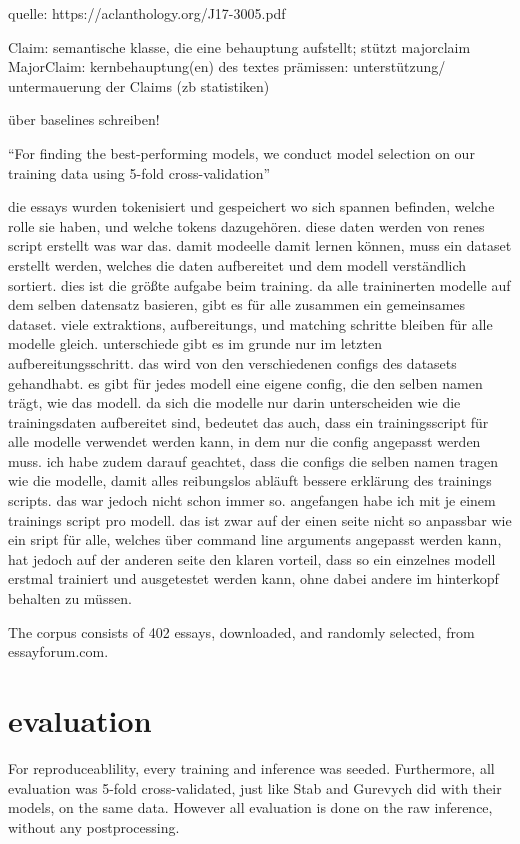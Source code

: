 \documentclass[12]{article}
\theoremstyle{mytheoremstyle}
\theoremstyle{mytheoremstyle}
\theoremstyle{myproblemstyle}
\begin{document}
  quelle: https://aclanthology.org/J17-3005.pdf

  Claim: semantische klasse, die eine behauptung aufstellt; stützt majorclaim 
  MajorClaim: kernbehauptung(en) des textes 
  prämissen: unterstützung/ untermauerung der Claims (zb statistiken) 

  über baselines schreiben!

  ``For finding the best-performing models, we conduct model selection on our training data using 5-fold cross-validation''


  die essays wurden tokenisiert und gespeichert wo sich spannen befinden, welche rolle sie haben, und welche tokens dazugehören. diese daten werden von renes script erstellt was war das. damit modeelle damit lernen können, muss ein dataset erstellt werden, welches die daten aufbereitet und dem modell verständlich sortiert. dies ist die größte aufgabe beim training. da alle traininerten modelle auf dem selben datensatz basieren, gibt es für alle zusammen ein gemeinsames dataset. viele extraktions, aufbereitungs, und matching schritte bleiben für alle modelle gleich. unterschiede gibt es im grunde nur im letzten aufbereitungsschritt. das wird von den verschiedenen configs des datasets gehandhabt. es gibt für jedes modell eine eigene config, die den selben namen trägt, wie das modell. da sich die modelle nur darin unterscheiden wie die trainingsdaten aufbereitet sind, bedeutet das auch, dass ein trainingsscript für alle modelle verwendet werden kann, in dem nur die config angepasst werden muss. ich habe zudem darauf geachtet, dass die configs die selben namen tragen wie die modelle, damit alles reibungslos abläuft bessere erklärung des trainings scripts. das war jedoch nicht schon immer so. angefangen habe ich mit je einem trainings script pro modell. das ist zwar auf der einen seite nicht so anpassbar wie ein sript für alle, welches über command line arguments angepasst werden kann, hat jedoch auf der anderen seite den klaren vorteil, dass so ein einzelnes modell erstmal trainiert und ausgetestet werden kann, ohne dabei andere im hinterkopf behalten zu müssen. 

The corpus consists of 402 essays, downloaded, and randomly selected, from essayforum.com. 
  \section{evaluation\dotfill}
  For reproduceablility, every training and inference was seeded. Furthermore, all evaluation was 5-fold cross-validated, just like Stab and Gurevych did with their models, on the same data. However all evaluation is done on the raw inference, without any postprocessing.\\
\end{document}
